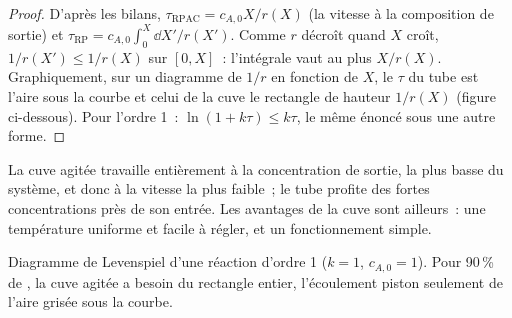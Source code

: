 \begin{proof}
D'après les bilans, $\tau_{\text{RPAC}} = c_{A,0}X/r(X)$ (la vitesse à la composition
de sortie) et $\tau_{\text{RP}} = c_{A,0}\int_0^X\dd X'/r(X')$. Comme $r$
décroît quand $X$ croît, $1/r(X') \leq 1/r(X)$ sur $[0, X]$~: l'intégrale
vaut au plus $X/r(X)$. Graphiquement, sur un diagramme de $1/r$ en fonction de $X$, le
$\tau$ du tube est l'aire sous la courbe et celui de la cuve le rectangle de
hauteur $1/r(X)$ (figure ci-dessous). Pour l'ordre 1~: $\ln(1 + k\tau) \leq k\tau$, le
même énoncé sous une autre forme.
\end{proof}

La cuve agitée travaille entièrement à la concentration de sortie, la plus basse
du système, et donc à la vitesse la plus faible~; le tube profite des fortes concentrations
près de son entrée. Les avantages de la cuve sont ailleurs~: une température uniforme et
facile à régler, et un fonctionnement simple.

\begin{omfigure}

{\small Diagramme de Levenspiel d'une réaction d'ordre 1 ($k = 1$, $c_{A,0} = 1$).
Pour 90\,\% de , la cuve agitée a besoin du rectangle entier, l'écoulement
piston seulement de l'aire grisée sous la courbe.}
\end{omfigure}

